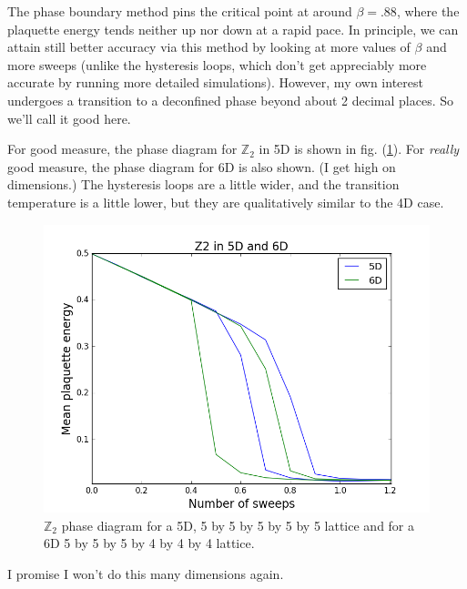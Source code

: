 \documentclass[9pt,twocolumn,twoside]{article}
\begin{document}
The phase boundary method pins the critical point at around $\beta= .88$, where the plaquette energy tends neither up nor down at a rapid pace.  In principle, we can attain still better accuracy via this method by looking at more values of $\beta$ and more sweeps (unlike the hysteresis loops, which don't get appreciably more accurate by running more detailed simulations).  However, my own interest undergoes a transition to a deconfined phase beyond about 2 decimal places.  So we'll call it good here. 

For good measure, the phase diagram for $\mathbb{Z}_2$ in 5D is shown in fig. (\ref{z2,56d}).  For \textit{really} good measure, the phase diagram for 6D is also shown.  (I get high on dimensions.)  The hysteresis loops are a little wider, and the transition temperature is a little lower, but they are qualitatively similar to the 4D case. 

\begin{figure}[h!]
	\begin{centering}
	\includegraphics[width=\columnwidth]{z2,56d}
	\caption{$\mathbb{Z}_2$ phase diagram for a 5D, 5 by 5 by 5 by 5 by 5 lattice and for a 6D 5 by 5 by 5 by 4 by 4 by 4 lattice.}
	\label{z2,56d}
	\end{centering}
\end{figure}

I promise I won't do this many dimensions again.  
\end{document}
